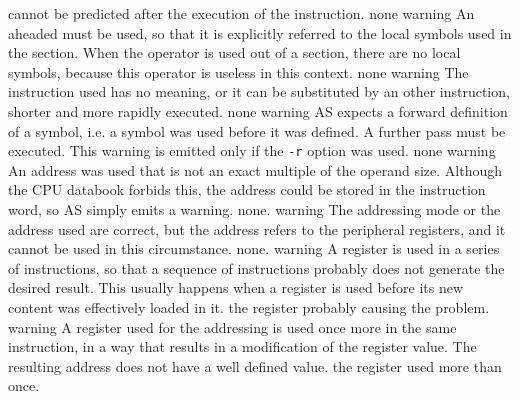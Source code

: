 \documentclass[12pt,twoside]{report}
\newcommand{\tty}[1]{{\tt #1}}
\newcommand{\asname}{{AS}}
\begin{document}
\begin{description}
{                cannot be predicted after the execution of the
                instruction.}
               {none}
               {warning}
               {An aheaded \@ must be used, so that it is
                explicitly referred to the local symbols used in the
                section. When the operator is used out of a section, there
                are no local symbols, because this operator is useless in
                this context.}
               {none}
               {warning}
               {The instruction used has no meaning, or it can be
                substituted by an other instruction, shorter and more
                rapidly executed.}
               {none}
               {warning}
               {\asname{} expects a forward definition of a symbol, i.e. a symbol
                was used before it was defined. A further pass must be
                executed. This warning is emitted only if the \tty{-r} option was
                used.}
               {none}
               {warning}
               {An address was used that is not an exact multiple of the
                operand size. Although the CPU databook forbids this, the
                address could be stored in the instruction word, so \asname{}
                simply emits a warning.}
               {none.}
               {warning}
               {The addressing mode or the address used are correct, but the
                address refers to the peripheral registers, and it
                cannot be used in this circumstance.}
               {none.}
               {warning}
               {A register is used in a series of instructions, so that a
                sequence of instructions probably does not generate the
                desired result. This usually happens when a register is
                used before its new content was effectively loaded in it.}
               {the register probably causing the problem.}
               {warning}
               {A register used for the addressing is used once more in the
                same instruction, in a way that results in a modification
                of the register value. The resulting address does not have a
                well defined value.}
               {the register used more than once.}

\end{description}
\end{document}
